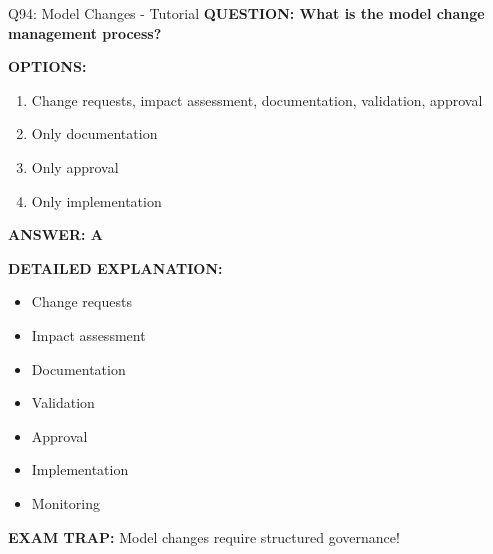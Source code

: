 \documentclass[8pt]{beamer}
\begin{document}
	\begin{frame}{Q94: Model Changes - Tutorial}
		\fontsize{6.5}{7.5}\selectfont
		\textbf{QUESTION: What is the model change management process?}
		
		\vspace{0.1cm}
		\textbf{OPTIONS:}
		\begin{enumerate}
			\item Change requests, impact assessment, documentation, validation, approval
			\item Only documentation
			\item Only approval
			\item Only implementation
		\end{enumerate}
		
		\vspace{0.1cm}
		\textcolor{myblue}{\textbf{ANSWER: A}}
		
		\vspace{0.1cm}
		\textbf{DETAILED EXPLANATION:}
		\begin{itemize}
			\item Change requests
			\item Impact assessment
			\item Documentation
			\item Validation
			\item Approval
			\item Implementation
			\item Monitoring
		\end{itemize}
		
		\vspace{0.1cm}
		\textcolor{myred}{\textbf{EXAM TRAP:}} Model changes require \textcolor{myblue}{structured governance}!
	\end{frame}
	
\end{document}

